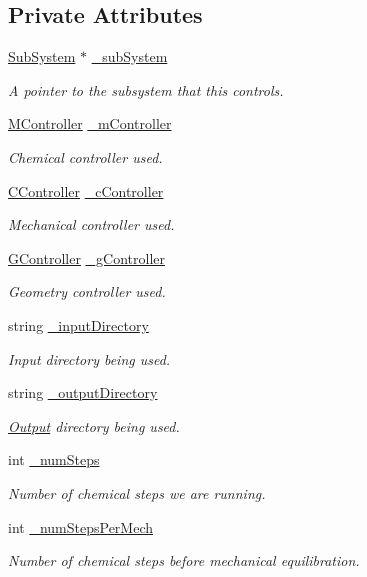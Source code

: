 \subsection*{Private Attributes}
\begin{DoxyCompactItemize}
\item 
\hyperlink{classSubSystem}{Sub\+System} $\ast$ \hyperlink{classController_a7798357b742dc62782fd7dd26b23528e}{\+\_\+sub\+System}
\begin{DoxyCompactList}\small\item\em A pointer to the subsystem that this controls. \end{DoxyCompactList}\item 
\hyperlink{classMController}{M\+Controller} \hyperlink{classController_a14e932b02f4c7029bfc1db1ad873d439}{\+\_\+m\+Controller}
\begin{DoxyCompactList}\small\item\em Chemical controller used. \end{DoxyCompactList}\item 
\hyperlink{classCController}{C\+Controller} \hyperlink{classController_ac886eba3ef8e4ee613f81459c664bd26}{\+\_\+c\+Controller}
\begin{DoxyCompactList}\small\item\em Mechanical controller used. \end{DoxyCompactList}\item 
\hyperlink{classGController}{G\+Controller} \hyperlink{classController_aa3ad741715e044ec7501b23c885bba57}{\+\_\+g\+Controller}
\begin{DoxyCompactList}\small\item\em Geometry controller used. \end{DoxyCompactList}\item 
string \hyperlink{classController_a0a7ccbe9ed377d7b12fde93c86b97da1}{\+\_\+input\+Directory}
\begin{DoxyCompactList}\small\item\em Input directory being used. \end{DoxyCompactList}\item 
string \hyperlink{classController_a4220a82387be41130d63223504a2cffe}{\+\_\+output\+Directory}
\begin{DoxyCompactList}\small\item\em \hyperlink{classOutput}{Output} directory being used. \end{DoxyCompactList}\item 
int \hyperlink{classController_adae40ed2ed9f44879930207bcff76ed0}{\+\_\+num\+Steps}
\begin{DoxyCompactList}\small\item\em Number of chemical steps we are running. \end{DoxyCompactList}\item 
int \hyperlink{classController_aa68939f419d5c6062f303ee85f24ad08}{\+\_\+num\+Steps\+Per\+Mech}
\begin{DoxyCompactList}\small\item\em Number of chemical steps before mechanical equilibration. \end{DoxyCompactList}\end{DoxyCompactItemize}


